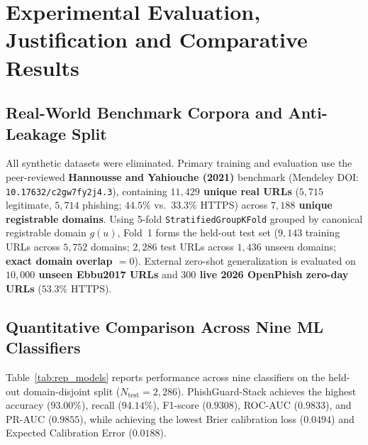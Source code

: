 \documentclass[12pt,a4paper]{report}
\begin{document}
\chapter[Experimental Evaluation and Comparative Results]{Experimental Evaluation, Justification and Comparative Results}

\section{Real-World Benchmark Corpora and Anti-Leakage Split}
All synthetic datasets were eliminated. Primary training and evaluation use the peer-reviewed \textbf{Hannousse and Yahiouche (2021)} benchmark \cite{hannousse2021} (Mendeley DOI: \texttt{10.17632/\allowbreak c2gw7fy2j4.3}), containing \textbf{$11{,}429$ unique real URLs} ($5{,}715$ legitimate, $5{,}714$ phishing; $44.5\%$ vs.\ $33.3\%$ HTTPS) across \textbf{$7{,}188$ unique registrable domains}. Using 5-fold \texttt{Stratified\allowbreak GroupKFold} grouped by canonical registrable domain $g(u)$, Fold~1 forms the held-out test set ($9{,}143$ training URLs across $5{,}752$ domains; $2{,}286$ test URLs across $1{,}436$ unseen domains; \textbf{exact domain overlap $= 0$}). External zero-shot generalization is evaluated on \textbf{$10{,}000$ unseen Ebbu2017 URLs} \cite{sahingoz2019} and \textbf{$300$ live 2026 OpenPhish zero-day URLs} ($53.3\%$ HTTPS).

\section{Quantitative Comparison Across Nine ML Classifiers}
Table~\ref{tab:rep_models} reports performance across nine classifiers on the held-out domain-disjoint split ($N_{\text{test}}=2{,}286$). PhishGuard-Stack achieves the highest accuracy ($93.00\%$), recall ($94.14\%$), F1-score ($0.9308$), ROC-AUC ($0.9833$), and PR-AUC ($0.9855$), while achieving the lowest Brier calibration loss ($0.0494$) and Expected Calibration Error ($0.0188$).
\end{document}
